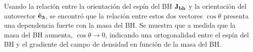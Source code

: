 \begin{abstracts}
Usando la relación entre la orientación del espín del BH ${\bf{J}_{bh}}$ y la orientación del autovector ${\bf{\vec{e}}_{3}}$, se encontró que la relación entre estos dos vectores $\cos\theta$ presenta una dependencia fuerte con la masa del BH. Se muestra que a medida que la masa del BH aumenta, $\cos\theta \to 0$, indicando una ortogonalidad entre el espín del BH y el gradiente del campo de densidad en función de la masa del BH. 







\end{abstracts}


